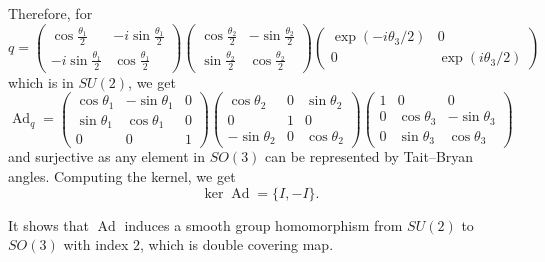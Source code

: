 \documentclass[a4paper, 12pt]{article}
\theoremstyle{Mydefinition}
\theoremstyle{Mytheorem}
\DeclareMathOperator{\Ad}{Ad}
\begin{document}
Therefore, for
\begin{equation*}
    q = \begin{pmatrix}
        \cos\frac{\theta_1}{2} & -i\sin\frac{\theta_1}{2} \\
        -i\sin\frac{\theta_1}{2} & \cos\frac{\theta_1}{2}
    \end{pmatrix}\begin{pmatrix}
        \cos\frac{\theta_2}{2} & -\sin\frac{\theta_2}{2} \\
        \sin\frac{\theta_2}{2} & \cos\frac{\theta_2}{2}
    \end{pmatrix}\begin{pmatrix}
        \exp(-i\theta_3/2) & 0 \\
        0 & \exp(i\theta_3/2)
    \end{pmatrix}
\end{equation*}
which is in $\mathit{SU}(2)$, we get
\begin{equation*}
    \Ad_{q} = \begin{pmatrix}
        \cos\theta_1 & -\sin\theta_1 & 0\\
        \sin\theta_1 & \cos\theta_1 & 0\\
        0 & 0 & 1
    \end{pmatrix}\begin{pmatrix}
        \cos\theta_2 & 0 & \sin\theta_2\\
        0 & 1 & 0\\
        -\sin\theta_2 & 0 & \cos\theta_2
    \end{pmatrix}\begin{pmatrix}
        1 & 0 & 0\\
        0 & \cos\theta_3 & -\sin\theta_3\\
        0 & \sin\theta_3 & \cos\theta_3
    \end{pmatrix}
\end{equation*}
and surjective as any element in $\mathit{SO}(3)$ can be represented by Tait–Bryan angles. Computing the kernel, we get
\begin{equation*}
    \ker \Ad = \{I, -I\}.
\end{equation*}

It shows that $\Ad$ induces a smooth group homomorphism from $\mathit{SU}(2)$ to $\mathit{SO}(3)$ with index $2$, which is double covering map.\\
\end{document}
